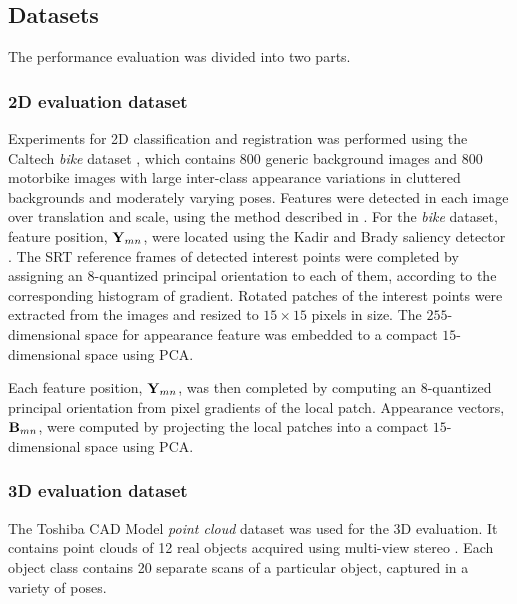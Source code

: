 \subsection{Datasets}
The performance evaluation was divided into two parts. 
\subsubsection{2D evaluation dataset}
Experiments for 2D classification and registration was performed using the Caltech \emph{bike } dataset \cite{ComputationalVisionLab2001}, which contains 800 generic background images and 800 motorbike images with large inter-class appearance variations in cluttered backgrounds and moderately varying poses. 
Features were detected in each image over translation and scale, using the method described in \cite{Fergus2007}. 
For the \emph{bike} dataset, feature position, $\mathbf{Y}_{mn}$, were located using the Kadir and Brady saliency detector \cite{Kadir2001}. The SRT reference frames of detected interest points were completed by assigning an $8$-quantized principal orientation to each of them, according to the corresponding histogram of gradient. Rotated patches of the interest points were extracted from the images and resized to $15 \times 15$ pixels in size.
The $255$-dimensional space for appearance feature was embedded to a compact $15$-dimensional space using PCA. 

Each feature position, $\mathbf{Y}_{mn}$, was then completed by computing an $8$-quantized principal orientation from pixel gradients of the local patch. Appearance vectors, $\mathbf{B}_{mn}$, were computed by projecting the local patches into a compact $15$-dimensional space using PCA.  

\subsubsection{3D evaluation dataset}
The Toshiba CAD Model \emph{point cloud} dataset \cite{Ltd.2011} was used for the 3D evaluation. It contains point clouds of 12 real objects acquired using multi-view stereo \cite{Vogiatzis2011}. Each object class contains 20 separate scans of a particular object, captured in a variety of poses. 

